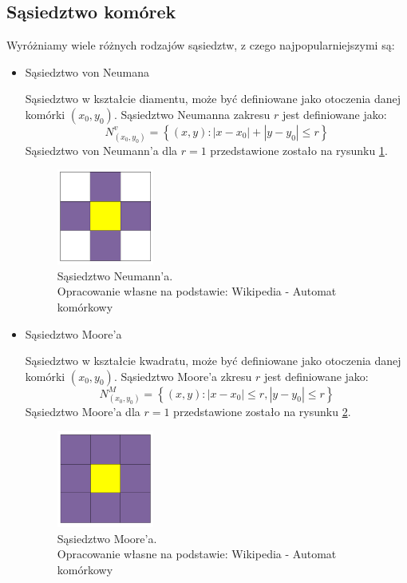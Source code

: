 \documentclass{sprawozdanie-agh}
\begin{document}
			\subsection{Sąsiedztwo komórek}

			Wyróżniamy wiele różnych rodzajów sąsiedztw, z czego najpopularniejszymi są: 
			\begin{itemize}
				\item Sąsiedztwo von Neumana \cite{wolframVonNeumann}
				
				Sąsiedztwo w kształcie diamentu, może być definiowane jako otoczenia danej komórki $(x_0,y_0)$. Sąsiedztwo Neumanna zakresu $ r $ jest definiowane jako:
				$$ N_{(x_0,y_0)}^{v} = \left\{ (x,y) : \left| x - x_0 \right| + \left| y - y_0 \right| \leq r \right\} $$
				Sąsiedztwo von Neumann'a dla $ r = 1 $ przedstawione zostało na rysunku \ref{fig:neumann}.

				\begin{figure}[H]
					\centering
					\captionsetup{justification=centering}
					  \includegraphics[width=0.3\textwidth]{neumann}
					\caption{Sąsiedztwo Neumann'a. \\ Opracowanie własne na podstawie: Wikipedia - Automat komórkowy}
					\label{fig:neumann}
				\end{figure}

				\item Sąsiedztwo Moore'a \cite{wolframMoore}
				
				Sąsiedztwo w kształcie kwadratu, może być definiowane jako otoczenia danej komórki $(x_0,y_0)$. Sąsiedztwo Moore'a zkresu $ r $ jest definiowane jako:
				$$ N_{(x_0,y_0)}^{M} = \left\{ (x,y) : \left| x - x_0 \right| \leq r, \left| y - y_0 \right| \leq r \right\} $$
				Sąsiedztwo Moore'a dla $ r = 1 $ przedstawione zostało na rysunku \ref{fig:moore}.

				\begin{figure}[H]
					\centering
					\captionsetup{justification=centering}
					  \includegraphics[width=0.3\textwidth]{moore}
					\caption{Sąsiedztwo Moore'a. \\ Opracowanie własne na podstawie: Wikipedia - Automat komórkowy}
					\label{fig:moore}
				\end{figure}

			\end{itemize}
\end{document}
